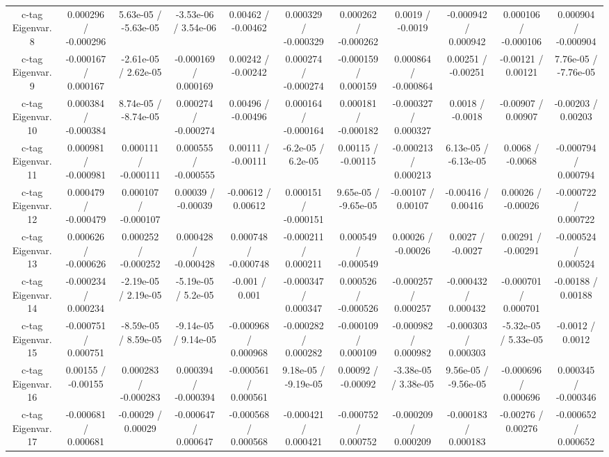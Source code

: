 \begin{table}[htbp]
\begin{center}
\begin{tabular}{|c|c|c|c|c|c|c|c|c|c|c|}
  c-tag Eigenvar. 8 & 0.000296 / -0.000296 & 5.63e-05 / -5.63e-05 & -3.53e-06 / 3.54e-06 & 0.00462 / -0.00462 & 0.000329 / -0.000329 & 0.000262 / -0.000262 & 0.0019 / -0.0019 & -0.000942 / 0.000942 & 0.000106 / -0.000106 & 0.000904 / -0.000904 \\ 
  c-tag Eigenvar. 9 & -0.000167 / 0.000167 & -2.61e-05 / 2.62e-05 & -0.000169 / 0.000169 & 0.00242 / -0.00242 & 0.000274 / -0.000274 & -0.000159 / 0.000159 & 0.000864 / -0.000864 & 0.00251 / -0.00251 & -0.00121 / 0.00121 & 7.76e-05 / -7.76e-05 \\ 
  c-tag Eigenvar. 10 & 0.000384 / -0.000384 & 8.74e-05 / -8.74e-05 & 0.000274 / -0.000274 & 0.00496 / -0.00496 & 0.000164 / -0.000164 & 0.000181 / -0.000182 & -0.000327 / 0.000327 & 0.0018 / -0.0018 & -0.00907 / 0.00907 & -0.00203 / 0.00203 \\ 
  c-tag Eigenvar. 11 & 0.000981 / -0.000981 & 0.000111 / -0.000111 & 0.000555 / -0.000555 & 0.00111 / -0.00111 & -6.2e-05 / 6.2e-05 & 0.00115 / -0.00115 & -0.000213 / 0.000213 & 6.13e-05 / -6.13e-05 & 0.0068 / -0.0068 & -0.000794 / 0.000794 \\ 
  c-tag Eigenvar. 12 & 0.000479 / -0.000479 & 0.000107 / -0.000107 & 0.00039 / -0.00039 & -0.00612 / 0.00612 & 0.000151 / -0.000151 & 9.65e-05 / -9.65e-05 & -0.00107 / 0.00107 & -0.00416 / 0.00416 & 0.00026 / -0.00026 & -0.000722 / 0.000722 \\ 
  c-tag Eigenvar. 13 & 0.000626 / -0.000626 & 0.000252 / -0.000252 & 0.000428 / -0.000428 & 0.000748 / -0.000748 & -0.000211 / 0.000211 & 0.000549 / -0.000549 & 0.00026 / -0.00026 & 0.0027 / -0.0027 & 0.00291 / -0.00291 & -0.000524 / 0.000524 \\ 
  c-tag Eigenvar. 14 & -0.000234 / 0.000234 & -2.19e-05 / 2.19e-05 & -5.19e-05 / 5.2e-05 & -0.001 / 0.001 & -0.000347 / 0.000347 & 0.000526 / -0.000526 & -0.000257 / 0.000257 & -0.000432 / 0.000432 & -0.000701 / 0.000701 & -0.00188 / 0.00188 \\ 
  c-tag Eigenvar. 15 & -0.000751 / 0.000751 & -8.59e-05 / 8.59e-05 & -9.14e-05 / 9.14e-05 & -0.000968 / 0.000968 & -0.000282 / 0.000282 & -0.000109 / 0.000109 & -0.000982 / 0.000982 & -0.000303 / 0.000303 & -5.32e-05 / 5.33e-05 & -0.0012 / 0.0012 \\ 
  c-tag Eigenvar. 16 & 0.00155 / -0.00155 & 0.000283 / -0.000283 & 0.000394 / -0.000394 & -0.000561 / 0.000561 & 9.18e-05 / -9.19e-05 & 0.00092 / -0.00092 & -3.38e-05 / 3.38e-05 & 9.56e-05 / -9.56e-05 & -0.000696 / 0.000696 & 0.000345 / -0.000346 \\ 
  c-tag Eigenvar. 17 & -0.000681 / 0.000681 & -0.00029 / 0.00029 & -0.000647 / 0.000647 & -0.000568 / 0.000568 & -0.000421 / 0.000421 & -0.000752 / 0.000752 & -0.000209 / 0.000209 & -0.000183 / 0.000183 & -0.00276 / 0.00276 & -0.000652 / 0.000652 \\ 

\end{tabular}
\end{center}
\end{table}
